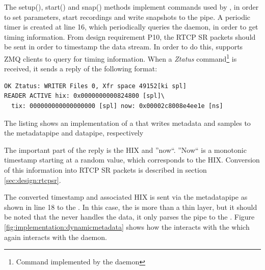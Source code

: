 The setup(), start() and snap() methods implement commands used by , in order to set parameters, start recordings and write snapshots to the pipe.
A periodic timer is created at line 16, which periodically queries the  daemon, in order to get timing information. From design requirement P10, the RTCP SR packets should be sent in order to timestamp the data stream. In order to do this,  supports ZMQ clients to query for timing information. When a \textit{Ztatus} command\footnote{Command implemented by the  daemon} is received, it sends a reply of the following format:


\begin{listing}[H] 
\begin{verbatim}
OK Ztatus: WRITER Files 0, Xfr space 49152[ki spl]
READER ACTIVE hix: 0x0000000000824800 [spl]\ 
  tix: 000000000000000000 [spl] now: 0x00002c8008e4ee1e [ns]
\end{verbatim}
\caption{The listing shows an implementation of a \pro{} that writes metadata and samples to the metadatapipe and datapipe, respectively}
\label{lst:implementation:snapshot1}
\end{listing}

The important part of the reply is the \ac{HIX} and ''now``. ''Now`` is a monotonic timestamp starting at a random value, which corresponds to the \ac{HIX}. Conversion of this information into RTCP SR packets is described in section \ref{sec:design:rtcpsr}.

The converted timestamp and associated \ac{HIX} is sent via the metadatapipe as shown in line 18 to the \pro{}. In this case, the \pro{} is more than a thin layer, but it should be noted that the \pro{} never handles the data, it only parses the pipe to the .
Figure \ref{fig:implementation:dynamicmetadata} shows how the \pub{} interacts with the \pro{} which again interacts with the \program{Snapshot} daemon.


